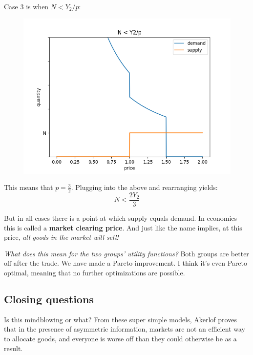 \documentclass[11pt]{article}
\begin{document}
\newpage
Case 3 is when $N < Y_2/p$:
\begin{figure}[h]
    \centering
    \includegraphics*[width=4.5in]{equilibrium3.png}
    \label{fig:equ3}
\end{figure}
\FloatBarrier

This means that $p=\frac{3}{2}$. Plugging into the above and rearranging yields:
\begin{equation}
    N < \frac{2Y_2}{3}
\end{equation}

But in all cases there is a point at which supply equals demand.
In economics this is called a {\bf market clearing price}.
And just like the name implies, at this price, {\it all goods in the market will sell!}

{\it What does this mean for the two groups' utility functions?} Both groups are better off after the trade. We have made a Pareto improvement. I think it's even Pareto optimal, meaning that no further optimizations are possible.


\subsection{Closing questions}

Is this mindblowing or what? From these super simple models, Akerlof proves that in the presence of asymmetric information, markets are not an efficient way to allocate goods, and everyone is worse off than they could otherwise be as a result.
\end{document}
